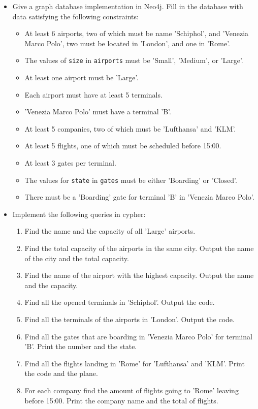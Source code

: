\documentclass[10pt,a4paper]{article}
\begin{document}
\begin{itemize}[noitemsep]
	\item Give a graph database implementation in Neo4j. Fill in the database with data satisfying the following constraints:
		\begin{itemize}
			\item At least 6 airports, two of which must be name 'Schiphol', and 'Venezia Marco Polo', two must be located in 'London', and one in 'Rome'.
			\item The values of \texttt{size} in \texttt{airports} must be 'Small', 'Medium', or 'Large'.
			\item At least one airport must be 'Large'.
			\item Each airport must have at least 5 terminals.
			\item 'Venezia Marco Polo' must have a terminal 'B'.
			\item At least 5 companies, two of which must be 'Lufthansa' and 'KLM'.
			\item At least 5 flights, one of which must be scheduled before 15:00.
			\item At least 3 gates per terminal.
			\item The values for \texttt{state} in \texttt{gates} must be either 'Boarding' or 'Closed'.
			\item There must be a 'Boarding' gate for terminal 'B' in 'Venezia Marco Polo'.
		\end{itemize}
	\item Implement the following queries in cypher:
		\begin{enumerate}[noitemsep]
			\item Find the name and the capacity of all 'Large' airports.
			\item Find the total capacity of the airports in the same city. Output the name of the city and the total capacity.
			\item Find the name of the airport with the highest capacity. Output the name and the capacity.
			\item Find all the opened terminals in 'Schiphol'. Output the code.
			\item Find all the terminals of the airports in 'London'. Output the code.
			\item Find all the gates that are boarding in 'Venezia Marco Polo' for terminal 'B'. Print the number and the state.
			\item Find all the flights landing in 'Rome' for 'Lufthansa' and 'KLM'. Print the code and the plane.
			\item For each company find the amount of flights going to 'Rome' leaving before 15:00. Print the company name and the total of flights.
		\end{enumerate}
\end{itemize}
\end{document}
